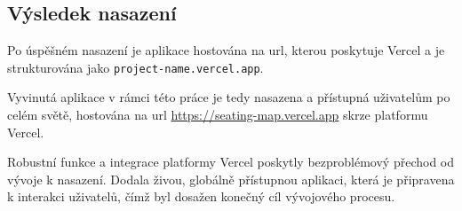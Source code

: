\subsection{Výsledek nasazení}
\label{subsec:implementace-vysledek-nasazeni}
Po úspěšném nasazení je aplikace hostována na \acs{url}, kterou poskytuje Vercel a je strukturována jako \texttt{project-name.vercel.app}.

Vyvinutá aplikace v rámci této práce je tedy nasazena a přístupná uživatelům po celém světě, hostována na \ac{url} \url{https://seating-map.vercel.app} skrze platformu Vercel.

Robustní funkce a integrace platformy Vercel poskytly bezproblémový přechod od vývoje k nasazení.
Dodala živou, globálně přístupnou aplikaci, která je připravena k interakci uživatelů, čímž byl dosažen konečný cíl vývojového procesu.
